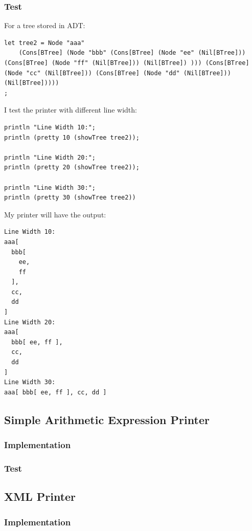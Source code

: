 \subsubsection{Test}

For a tree stored in ADT:
\begin{lstlisting}
let tree2 = Node "aaa"
    (Cons[BTree] (Node "bbb" (Cons[BTree] (Node "ee" (Nil[BTree])) (Cons[BTree] (Node "ff" (Nil[BTree])) (Nil[BTree]) ))) (Cons[BTree] (Node "cc" (Nil[BTree])) (Cons[BTree] (Node "dd" (Nil[BTree])) (Nil[BTree]))))
;
\end{lstlisting}

I test the printer with different line width:
\begin{lstlisting}
println "Line Width 10:";
println (pretty 10 (showTree tree2));

println "Line Width 20:";
println (pretty 20 (showTree tree2));

println "Line Width 30:";
println (pretty 30 (showTree tree2))
\end{lstlisting}

My printer will have the output:
\begin{lstlisting}
Line Width 10:
aaa[
  bbb[
    ee,
    ff
  ],
  cc,
  dd
]
Line Width 20:
aaa[
  bbb[ ee, ff ],
  cc,
  dd
]
Line Width 30:
aaa[ bbb[ ee, ff ], cc, dd ]
\end{lstlisting}

\subsection{Simple Arithmetic Expression Printer}

\subsubsection{Implementation}

\subsubsection{Test}

\subsection{XML Printer}

\subsubsection{Implementation}

